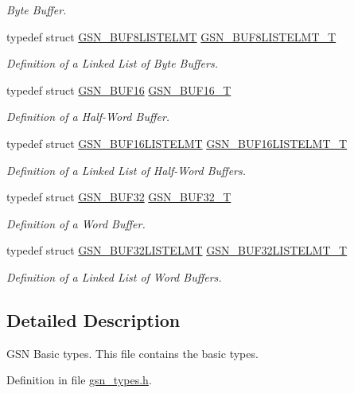\begin{DoxyCompactItemize}
\begin{DoxyCompactList}\small\item\em Byte Buffer. \end{DoxyCompactList}\item 
typedef struct \hyperlink{a00034}{GSN\_\-BUF8LISTELMT} \hyperlink{a00654_ga99a362860e397ed25f4481f88b5b792e}{GSN\_\-BUF8LISTELMT\_\-T}
\begin{DoxyCompactList}\small\item\em Definition of a Linked List of Byte Buffers. \end{DoxyCompactList}\item 
typedef struct \hyperlink{a00029}{GSN\_\-BUF16} \hyperlink{a00654_ga4fdddff0bde69bd592327bf3914b4c39}{GSN\_\-BUF16\_\-T}
\begin{DoxyCompactList}\small\item\em Definition of a Half-\/Word Buffer. \end{DoxyCompactList}\item 
typedef struct \hyperlink{a00030}{GSN\_\-BUF16LISTELMT} \hyperlink{a00654_ga6635dc0a6b962b379e55c1fff1ab6298}{GSN\_\-BUF16LISTELMT\_\-T}
\begin{DoxyCompactList}\small\item\em Definition of a Linked List of Half-\/Word Buffers. \end{DoxyCompactList}\item 
typedef struct \hyperlink{a00031}{GSN\_\-BUF32} \hyperlink{a00654_ga8a61cbeed769180229c38ff66d0d820c}{GSN\_\-BUF32\_\-T}
\begin{DoxyCompactList}\small\item\em Definition of a Word Buffer. \end{DoxyCompactList}\item 
typedef struct \hyperlink{a00032}{GSN\_\-BUF32LISTELMT} \hyperlink{a00654_ga885b6249f0604d742fc832fa1c221d5e}{GSN\_\-BUF32LISTELMT\_\-T}
\begin{DoxyCompactList}\small\item\em Definition of a Linked List of Word Buffers. \end{DoxyCompactList}\end{DoxyCompactItemize}


\subsection{Detailed Description}
GSN Basic types. This file contains the basic types. 

Definition in file \hyperlink{a00599_source}{gsn\_\-types.h}.



